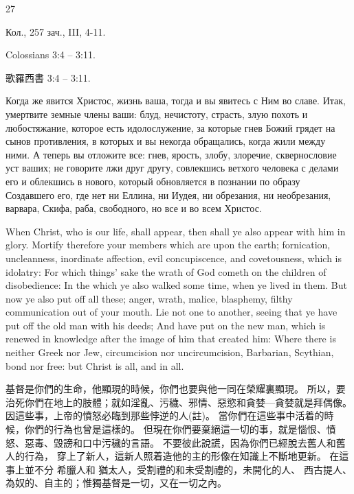 27

\onehalfspacing %

\onehalfspacing %

\Large

Кол., 257 зач., III, 4-11.

Colossians 3:4 -- 3:11.

歌羅西書 3:4 -- 3:11.

Когда же явится Христос, жизнь ваша, тогда и вы явитесь с Ним во славе.
Итак, умертвите земные члены ваши: блуд, нечистоту, страсть, злую похоть и любостяжание, которое есть идолослужение,
за которые гнев Божий грядет на сынов противления,
в которых и вы некогда обращались, когда жили между ними.
А теперь вы отложите все: гнев, ярость, злобу, злоречие, сквернословие уст ваших;
не говорите лжи друг другу, совлекшись ветхого человека с делами его
и облекшись в нового, который обновляется в познании по образу Создавшего его,
где нет ни Еллина, ни Иудея, ни обрезания, ни необрезания, варвара, Скифа, раба, свободного, но все и во всем Христос. 

When Christ, who is our life, shall appear, then shall ye also appear with him in glory.
Mortify therefore your members which are upon the earth; fornication, uncleanness, inordinate affection, evil concupiscence, and covetousness, which is idolatry:
For which things' sake the wrath of God cometh on the children of disobedience:
In the which ye also walked some time, when ye lived in them.
But now ye also put off all these; anger, wrath, malice, blasphemy, filthy communication out of your mouth.
Lie not one to another, seeing that ye have put off the old man with his deeds;
And have put on the new man, which is renewed in knowledge after the image of him that created him:
Where there is neither Greek nor Jew, circumcision nor uncircumcision, Barbarian, Scythian, bond nor free: but Christ is all, and in all.

基督是你們的生命，他顯現的時候，你們也要與他一同在榮耀裏顯現。
所以，要治死你們在地上的肢體；就如淫亂、污穢、邪情、惡慾和貪婪—貪婪就是拜偶像。
因這些事，上帝的憤怒必臨到那些悖逆的人(註)。
當你們在這些事中活着的時候，你們的行為也曾是這樣的。
但現在你們要棄絕這一切的事，就是惱恨、憤怒、惡毒、毀謗和口中污穢的言語。
不要彼此說謊，因為你們已經脫去舊人和舊人的行為，
穿上了新人，這新人照着造他的主的形像在知識上不斷地更新。
在這事上並不分 希臘人和 猶太人，受割禮的和未受割禮的，未開化的人、 西古提人、為奴的、自主的；惟獨基督是一切，又在一切之內。 
